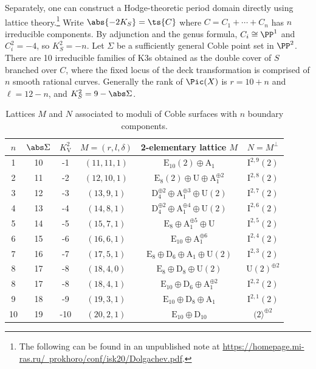\documentclass[../main.tex]{subfiles}
\begin{document}
\begin{remark}
Separately, one can construct a Hodge-theoretic period domain directly using lattice theory.\footnote{
The following can be found in an unpublished note at \href{https://homepage.mi-ras.ru/~prokhoro/conf/isk20/Dolgachev.pdf}{https://homepage.mi-ras.ru/~prokhoro/conf/isk20/Dolgachev.pdf}.
}
Write $\abs{-2K_S} = \ts{C}$ where $C = C_1 + \cdots + C_n$ has $n$ irreducible components. By adjunction and the genus formula, $C_i\cong \PP^1$ and $C_i^2 = -4$, so $K_S^2 = -n$. Let $\Sigma$ be a sufficiently general Coble point set in $\PP^2$. There are 10 irreducible families of K3s obtained as the double cover of $S$ branched over $C$, where the fixed locus of the deck transformation is comprised of $n$ smooth rational curves. Generally the rank of $\Pic(X)$ is $r=10+n$ and $\ell = 12-n$, and $K_S^2 = 9-\abs\Sigma$.

\begin{table}[h!]
\centering
\begin{tabular}{|c|c|c|c|c|c|}
\hline$n$ & $\abs\Sigma$ & $K_{\mathrm{V}}^{2}$ & $M = (r, l, \delta)$ & 2-elementary lattice $M$ & $N=M^{\perp}$ \\
\hline 1 & 10 & -1 & $(11,11,1)$ & $\mathrm{E}_{10}(2) \oplus \mathrm{A}_{1}$ & $\mathrm{I}^{2,9}(2)$ \\
2 & 11 & -2 & $(12,10,1)$ & $\mathrm{E}_{8}(2) \oplus \mathrm{U} \oplus \mathrm{A}_1^{\oplus 2}$ & $\mathrm{I}^{2,8}(2)$ \\
3 & 12 & -3 & $(13,9,1)$ & $\mathrm{D}_{4}^{\oplus 2} \oplus \mathrm{A}_{1}^{\oplus 3} \oplus \mathrm{U}(2)$ & $\mathrm{I}^{2,7}(2)$ \\
4 & 13 & -4 & $(14,8,1)$ & $\mathrm{D}_{4}^{\oplus 2} \oplus \mathrm{A}_{1}^{\oplus 4} \oplus \mathrm{U}(2)$ & $\mathrm{I}^{2,6}(2)$ \\
5 & 14 & -5 & $(15,7,1)$ & $\mathrm{E}_{8} \oplus \mathrm{A}_{1}^{\oplus 5} \oplus \mathrm{U}$ & $\mathrm{I}^{2,5}(2)$ \\
6 & 15 & -6 & $(16,6,1)$ & $\mathrm{E}_{10} \oplus \mathrm{A}_{1}^{\oplus 6}$ & $\mathrm{I}^{2,4}(2)$ \\
7 & 16 & -7 & $(17,5,1)$ & $\mathrm{E}_{8} \oplus \mathrm{D}_{6} \oplus \mathrm{A}_{1} \oplus \mathrm{U}(2)$ & $\mathrm{I}^{2,3}(2)$ \\
8 & 17 & -8 & $(18,4,0)$ & $\mathrm{E}_{8} \oplus \mathrm{D}_{8} \oplus \mathrm{U}(2)$ & $\mathrm{U}(2)^{\oplus 2}$ \\
8 & 17 & -8 & $(18,4,1)$ & $\mathrm{E}_{10} \oplus \mathrm{D}_{6} \oplus \mathrm{A}_{1}^{\oplus 2}$ & $\mathrm{I}^{2,2}(2)$ \\
9 & 18 & -9 & $(19,3,1)$ & $\mathrm{E}_{10} \oplus \mathrm{D}_{8} \oplus \mathrm{A}_{1}$ & $\mathrm{I}^{2,1}(2)$ \\
10 & 19 & -10 & $(20,2,1)$ & $\mathrm{E}_{10} \oplus \mathrm{D}_{10}$ & $(2\rangle^{\oplus 2}$ \\
\hline
\end{tabular}
\label{table:coble-lattices}
\caption{Lattices $M$ and $N$ associated to moduli of Coble surfaces with $n$ boundary components.}
\end{table}


\end{remark}
\end{document}

